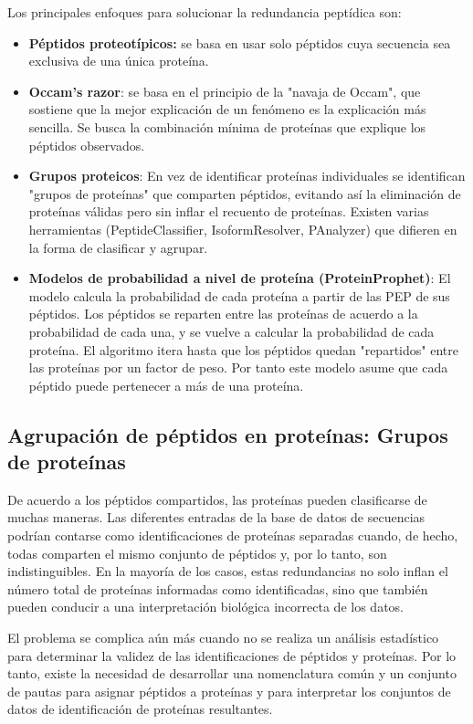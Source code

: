 Los principales enfoques para solucionar la redundancia peptídica son:
\begin{itemize}
\item \textbf{Péptidos proteotípicos:} se basa en usar solo péptidos cuya secuencia sea exclusiva de una única proteína.
\item \textbf{Occam's razor}: se basa en el principio de la "navaja de Occam", que sostiene que la mejor explicación de un fenómeno es la explicación más sencilla. Se busca la combinación mínima de proteínas que explique los péptidos observados.
\item \textbf{Grupos proteicos}: En vez de identificar proteínas individuales se identifican "grupos de proteínas" que comparten péptidos, evitando así la eliminación de proteínas válidas pero sin inflar el recuento de proteínas. Existen varias herramientas (PeptideClassifier, IsoformResolver, PAnalyzer) que difieren en la forma de clasificar y agrupar.
\item \textbf{Modelos de probabilidad a nivel de proteína (ProteinProphet)}: El modelo calcula la probabilidad de cada proteína a partir de las PEP de sus péptidos. Los péptidos se reparten entre las proteínas de acuerdo a la probabilidad de cada una, y se vuelve a calcular la probabilidad de cada proteína. El algoritmo itera hasta que los péptidos quedan "repartidos" entre las proteínas por un factor de peso. Por tanto este modelo asume que cada péptido puede pertenecer a más de una proteína.
\end{itemize}

\subsection{Agrupación de péptidos en proteínas: Grupos de proteínas}
De acuerdo a los péptidos compartidos, las proteínas pueden clasificarse de muchas maneras. Las diferentes entradas de la base de datos de secuencias podrían contarse como identificaciones de proteínas separadas cuando, de hecho, todas comparten el mismo conjunto de péptidos y, por lo tanto, son indistinguibles. En la mayoría de los casos, estas redundancias no solo inflan el número total de proteínas informadas como identificadas, sino que también pueden conducir a una interpretación biológica incorrecta de los datos.

El problema se complica aún más cuando no se realiza un análisis estadístico para determinar la validez de las identificaciones de péptidos y proteínas. Por lo tanto, existe la necesidad de desarrollar una nomenclatura común y un conjunto de pautas para asignar péptidos a proteínas y para interpretar los conjuntos de datos de identificación de proteínas resultantes.

